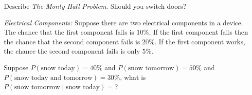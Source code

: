 \documentclass[addpoints,12pt]{exam}
\begin{document}
\begin{questions}
\addpoints

\question[2]
Describe \emph{The Monty Hall Problem}. Should you switch doors?

\vspace{2in}

\question[3]
\emph{Electrical Components:} Suppose there are two electrical components in a device. The chance that the first component fails is 10\%. If the first component fails then the chance that the second component fails is 20\%. If the first component works, the chance the second component fails is only 5\%.
\noaddpoints
{}
\addpoints


\question[1] Suppose $P(\text{snow today})=40\%$ and $P(\text{snow tomorrow})=50\%$ and $P(\text{snow today and tomorrow})=30\%$, what is $P(\text{snow tomorrow}\mid \text{snow today})=$?


\end{questions}
\end{document}
